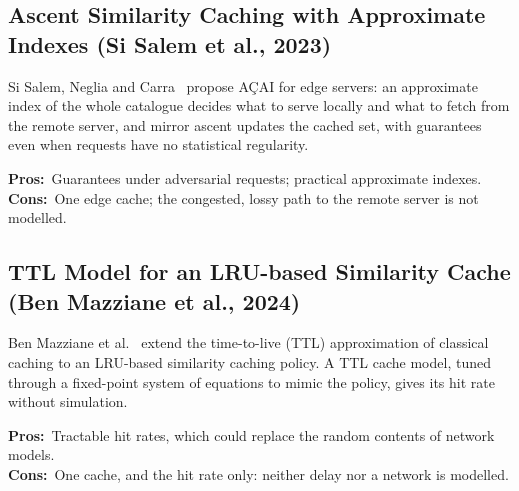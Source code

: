 \documentclass[11pt,a4paper]{article}
\newcommand{\pros}{\textcolor{green!50!black}{\textbf{Pros:}}~}
\newcommand{\cons}{\textcolor{red!70!black}{\textbf{Cons:}}~}
\begin{document}
\subsection{Ascent Similarity Caching with Approximate Indexes (Si Salem et al., 2023)}
Si Salem, Neglia and Carra~\cite{sisalem2023acai} propose A\c{C}AI for edge servers: an approximate
index of the whole catalogue decides what to serve locally and what to fetch from the remote server,
and mirror ascent updates the cached set, with guarantees even when requests have no statistical
regularity.

\pros Guarantees under adversarial requests; practical approximate indexes.\\
\cons One edge cache; the congested, lossy path to the remote server is not modelled.

\subsection{TTL Model for an LRU-based Similarity Cache (Ben Mazziane et al., 2024)}
Ben Mazziane et al.~\cite{benmazziane2024ttl} extend the time-to-live (TTL) approximation of classical
caching to an LRU-based similarity caching policy. A TTL cache model, tuned through a fixed-point
system of equations to mimic the policy, gives its hit rate without simulation.

\pros Tractable hit rates, which could replace the random contents of network models.\\
\cons One cache, and the hit rate only: neither delay nor a network is modelled.
\end{document}
